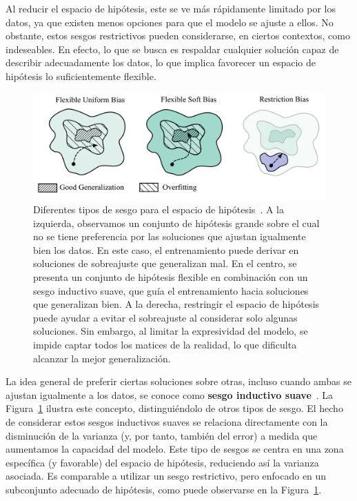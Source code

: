 Al reducir el espacio de hipótesis, este se ve más rápidamente limitado por los datos, ya que existen menos opciones para que el modelo se ajuste a ellos. No obstante, estos sesgos restrictivos pueden considerarse, en ciertos contextos, como indeseables. En efecto, lo que se busca es respaldar cualquier solución capaz de describir adecuadamente los datos, lo que implica favorecer un espacio de hipótesis lo suficientemente flexible.

\begin{figure}[h]
    \centering
    \includegraphics[width=0.6\linewidth]{img/types-of-bias.png}
    \caption[Diferentes tipos de sesgo para el espacio de hipótesis~\cite{Wilson2025}.]{Diferentes tipos de sesgo para el espacio de hipótesis~\cite{Wilson2025}. A la izquierda, observamos un conjunto de hipótesis grande sobre el cual no se tiene preferencia por las soluciones que ajustan igualmente bien los datos. En este caso, el entrenamiento puede derivar en soluciones de sobreajuste que generalizan mal. En el centro, se presenta un conjunto de hipótesis flexible en combinación con un sesgo inductivo suave, que guía el entrenamiento hacia soluciones que generalizan bien. A la derecha, restringir el espacio de hipótesis puede ayudar a evitar el sobreajuste al considerar solo algunas soluciones. Sin embargo, al limitar la expresividad del modelo, se impide captar todos los matices de la realidad, lo que dificulta alcanzar la mejor generalización.}\label{fig:types-of-bias}
\end{figure}

La idea general de preferir ciertas soluciones sobre otras, incluso cuando ambas se ajustan igualmente a los datos, se conoce como \textbf{sesgo inductivo suave}~\cite{Wilson2025}. La Figura~\ref{fig:types-of-bias} ilustra este concepto, distinguiéndolo de otros tipos de sesgo. El hecho de considerar estos sesgos inductivos suaves se relaciona directamente con la disminución de la varianza (y, por tanto, también del error) a medida que aumentamos la capacidad del modelo. Este tipo de sesgos se centra en una zona específica (y favorable) del espacio de hipótesis, reduciendo así la varianza asociada. Es comparable a utilizar un sesgo restrictivo, pero enfocado en un subconjunto adecuado de hipótesis, como puede observarse en la Figura~\ref{fig:types-of-bias}.

